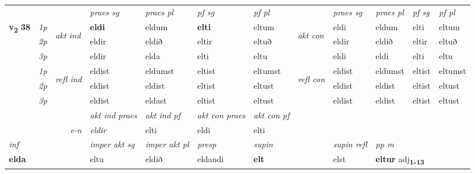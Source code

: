 \begin{longtable}[l]{X>{\footnotesize\itshape}llXXXXlXXXX}
 & &   & \textit{praes sg}  & \textit{praes pl}    & \textit{ pf sg} & \textit{pf pl} & & \textit{praes sg}  & \textit{praes pl}    & \textit{pf sg} & \textit{pf pl }  \\ \cmidrule{4-7} \cmidrule{9-12}
 \multirow{2}{*}{{{\textbf{v{\textsubscript{2}}} \Large{\textbf{38}}}}}  & 1p & \multirow{3}{*}{\begin{turn}{90}\textit{akt ind}\end{turn}} & \textbf{eldi} & eldum & \textbf{elti} & eltum & \multirow{3}{*}{\begin{turn}{90}\textit{akt con}\end{turn}} &eldi & eldum & elti & eltum\\*
 & 2p &  &  eldir  & eldið & eltir & eltuð & & eldir & eldið & eltir & eltuð \\*
 & 3p &  & eldir & elda & elti & eltu & & eldi & eldi& elti & eltu \\*
\cmidrule{4-7} \cmidrule{9-12}
 & 1p & \multirow{3}{*}{\begin{turn}{90}\textit{refl ind}\end{turn}}  & eldist & eldumst & eltist & eltumst & \multirow{3}{*}{\begin{turn}{90}\textit{refl con}\end{turn}}  &eldist & eldumst & eltist & eltumst \\*
 & 2p &  & eldist & eldist & eltist & eltust & &eldist & eldist & eltist & eltust \\*
 & 3p  & & eldist & eldast & eltist & eltust & & eldist & eldist& eltist & eltust \\*
\cmidrule{4-7} \cmidrule{9-12}

   && &  \textit{akt ind praes} & \textit{akt ind pf} & \textit{akt con praes} & \textit{akt con pf} \\*
\multicolumn{3}{r}{\textit{e-n}} & eldir & elti & eldi & elti \\*

\cmidrule{4-7}
   {\textit{inf}} & &  & \textit{imper akt sg} & \textit{imper akt pl}   & \textit{presp} & \textit{supin} && \textit{supin refl} & \textit{pp m} \\*
  {\textbf{elda}} & && eltu  & eldið   & eldandi &  \textbf{elt} && elst & \multicolumn{2}{l}{\textbf{eltur} adj\textbf{\textsubscript{1-13}}} \\*

\midrule


\end{longtable}

